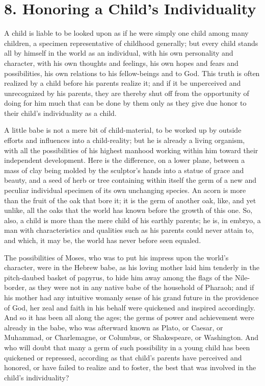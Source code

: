 \documentclass[
]{book}
\begin{document}
\hypertarget{honoring-a-childs-individuality}{%
\chapter{8. Honoring a Child's Individuality}\label{honoring-a-childs-individuality}}

A child is liable to be looked upon as if he were simply one child among many children, a specimen representative of childhood generally; but every child stands all by himself in the world as an individual, with his own personality and character, with his own thoughts and feelings, his own hopes and fears and possibilities, his own relations to his fellow-beings and to God. This truth is often realized by a child before his parents realize it; and if it be unperceived and unrecognized by his parents, they are thereby shut off from the opportunity of doing for him much that can be done by them only as they give due honor to their child's individuality as a child.

A little babe is not a mere bit of child-material, to be worked up by outside efforts and influences into a child-reality; but he is already a living organism, with all the possibilities of his highest manhood working within him toward their independent development. Here is the difference, on a lower plane, between a mass of clay being molded by the sculptor's hands into a statue of grace and beauty, and a seed of herb or tree containing within itself the germ of a new and peculiar individual specimen of its own unchanging species. An acorn is more than the fruit of the oak that bore it; it is the germ of another oak, like, and yet unlike, all the oaks that the world has known before the growth of this one. So, also, a child is more than the mere child of his earthly parents; he is, in embryo, a man with characteristics and qualities such as his parents could never attain to, and which, it may be, the world has never before seen equaled.

The possibilities of Moses, who was to put his impress upon the world's character, were in the Hebrew babe, as his loving mother laid him tenderly in the pitch-daubed basket of papyrus, to hide him away among the flags of the Nile-border, as they were not in any native babe of the household of Pharaoh; and if his mother had any intuitive womanly sense of his grand future in the providence of God, her zeal and faith in his behalf were quickened and inspired accordingly. And so it has been all along the ages; the germs of power and achievement were already in the babe, who was afterward known as Plato, or Caesar, or Muhammad, or Charlemagne, or Columbus, or Shakespeare, or Washington. And who will doubt that many a germ of such possibility in a young child has been quickened or repressed, according as that child's parents have perceived and honored, or have failed to realize and to foster, the best that was involved in the child's individuality?
\end{document}
